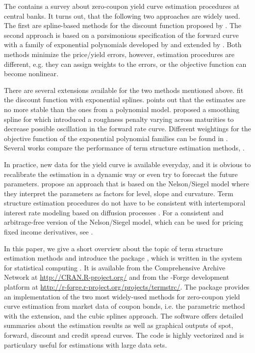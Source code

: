 The \cite{BIS2005} contains a survey about zero-coupon yield curve estimation procedures at central banks. It turns out, that the following two approaches are widely used. The first are spline-based methods for the discount function proposed by \cite{McCulloch1971, McCulloch1975}. The second approach is based on a parsimonious specification of the forward curve with a family of exponential polynomials developed by \cite{Nelson1987} and extended by \cite{Svensson1994}. Both methods minimize the price/yield errors, however, estimation procedures are different, e.g. they can assign weights to the errors, or the objective function can become nonlinear.

There are several extensions available for the two methods mentioned above. \cite{Vasicek1982} fit the discount function with exponential splines. \cite{Shea1985} points out that the estimates are no more stable than the ones from a polynomial model. \cite{Fisher1995} proposed a smoothing spline for which \cite{Waggoner1997} introduced a roughness penalty varying across maturities to decrease possible oscillation in the forward rate curve. Different weightings for the objective function of the exponential polynomial families can be found in \cite{Soederlind1997}. Several works compare the performance of term structure estimation methods, \citep[see, e.g.][]{Bliss1997, Bolder1999, Ioannides2003}.

In practice, new data for the yield curve is available everyday, and it is obvious to recalibrate the estimation in a dynamic way or even try to forecast the future parameters. \cite{Diebold2006} propose an approach that is based on the Nelson/Siegel model where they interpret the parameters as factors for level, slope and curvature. Term structure estimation procedures do not have to be consistent with intertemporal interest rate modeling based on diffusion processes \citep[see, e.g.][]{Bjoerk1999, Filipovic1999}. For a consistent and arbitrage-free version of the Nelson/Siegel model, which can be used for pricing fixed income derivatives, see \cite{Christensen2007}.   

In this paper, we give a short overview about the topic of term structure estimation methods and introduce the package , which is written in the  system for statistical computing \citep{R2008}. It is available from the Comprehensive  Archive Network at \url{http://CRAN.R-project.org/} and from the -Forge development platform at \url{http://r-forge.r-project.org/projects/termstrc/}. The package provides an implementation of the two most widely-used methods for zero-coupon yield curve estimation from market data of coupon bonds, i.e. the parametric \cite{Nelson1987} method with the \cite{Svensson1994} extension, and the \cite{McCulloch1975} cubic splines approach. The software offers detailed summaries about the estimation results as well as graphical outputs of spot, forward, discount and credit spread curves. The code is highly vectorized and is particulary useful for estimations with large data sets.

